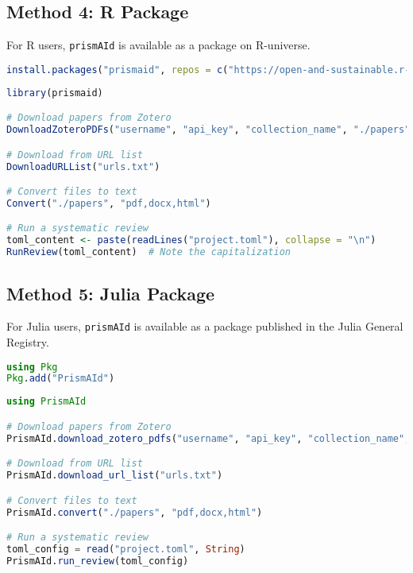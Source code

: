 \subsection{Method 4: R Package}

For R users, \texttt{prismAId} is available as a package on R-universe.

\begin{commandbox}
\begin{lstlisting}[language=R]
install.packages("prismaid", repos = c("https://open-and-sustainable.r-universe.dev", "https://cloud.r-project.org"))
\end{lstlisting}
\end{commandbox}

\begin{commandbox}
\begin{lstlisting}[language=R]
library(prismaid)

# Download papers from Zotero
DownloadZoteroPDFs("username", "api_key", "collection_name", "./papers")

# Download from URL list
DownloadURLList("urls.txt")

# Convert files to text
Convert("./papers", "pdf,docx,html")

# Run a systematic review
toml_content <- paste(readLines("project.toml"), collapse = "\n")
RunReview(toml_content)  # Note the capitalization
\end{lstlisting}
\end{commandbox}

\subsection{Method 5: Julia Package}

For Julia users, \texttt{prismAId} is available as a package published in the Julia General Registry.

\begin{commandbox}
\begin{lstlisting}[language=Julia]
using Pkg
Pkg.add("PrismAId")
\end{lstlisting}
\end{commandbox}

\begin{commandbox}
\begin{lstlisting}[language=Julia]
using PrismAId

# Download papers from Zotero
PrismAId.download_zotero_pdfs("username", "api_key", "collection_name", "./papers")

# Download from URL list
PrismAId.download_url_list("urls.txt")

# Convert files to text
PrismAId.convert("./papers", "pdf,docx,html")

# Run a systematic review
toml_config = read("project.toml", String)
PrismAId.run_review(toml_config)
\end{lstlisting}
\end{commandbox}

